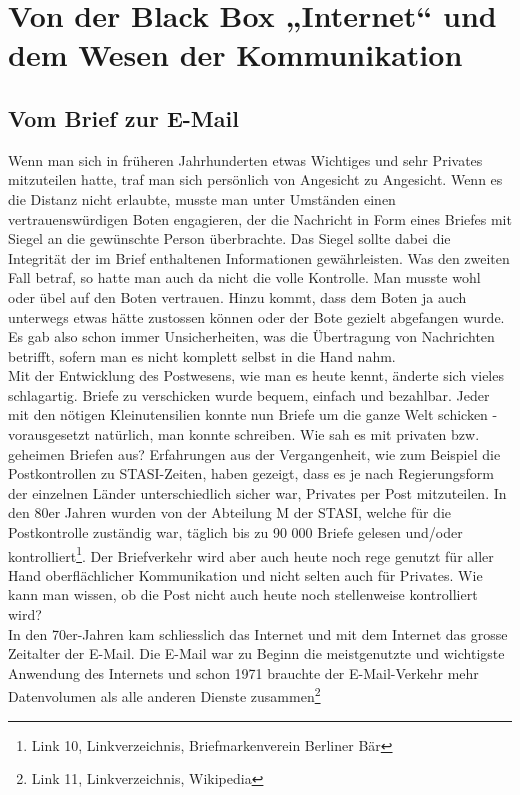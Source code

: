 \newpage
\section{Von der Black Box „Internet“ und dem Wesen der Kommunikation}

\subsection{Vom Brief zur E-Mail}
Wenn man sich in früheren Jahrhunderten etwas Wichtiges und sehr Privates mitzuteilen hatte, traf man sich persönlich von Angesicht zu Angesicht. Wenn es die Distanz nicht erlaubte, musste man unter Umständen einen vertrauenswürdigen Boten engagieren, der die Nachricht in Form eines Briefes mit Siegel an die gewünschte Person überbrachte. Das Siegel sollte dabei die Integrität der im Brief enthaltenen Informationen gewährleisten. Was den zweiten Fall betraf, so hatte man auch da nicht die volle Kontrolle. Man musste wohl oder übel auf den Boten vertrauen. Hinzu kommt, dass dem Boten ja auch unterwegs etwas hätte zustossen können oder der Bote gezielt abgefangen wurde. Es gab also schon immer Unsicherheiten, was die Übertragung von Nachrichten betrifft, sofern man es nicht komplett selbst in die Hand nahm.
\\
Mit der Entwicklung des Postwesens, wie man es heute kennt, änderte sich vieles schlagartig. Briefe zu verschicken wurde bequem, einfach und bezahlbar. Jeder mit den nötigen Kleinutensilien konnte nun Briefe um die ganze Welt schicken - vorausgesetzt natürlich, man konnte schreiben. Wie sah es mit privaten bzw. geheimen Briefen aus? Erfahrungen aus der Vergangenheit, wie zum Beispiel die Postkontrollen zu STASI-Zeiten, haben gezeigt, dass es je nach Regierungsform der einzelnen Länder unterschiedlich sicher war, Privates per Post mitzuteilen. In den 80er Jahren wurden von der Abteilung M der STASI, welche für die Postkontrolle zuständig war, täglich bis zu 90 000 Briefe gelesen und/oder kontrolliert\footnote{Link 10, Linkverzeichnis, Briefmarkenverein Berliner Bär}.
Der Briefverkehr wird aber auch heute noch rege genutzt für aller Hand oberflächlicher Kommunikation und nicht selten auch für Privates. Wie kann man wissen, ob die Post nicht auch heute noch stellenweise kontrolliert wird?
\\
In den 70er-Jahren kam schliesslich das Internet und mit dem Internet das grosse Zeitalter der E-Mail. Die E-Mail war zu Beginn die meistgenutzte und wichtigste Anwendung des Internets und schon 1971 brauchte der E-Mail-Verkehr mehr Datenvolumen als alle anderen Dienste zusammen\footnote{Link 11, Linkverzeichnis, Wikipedia}
